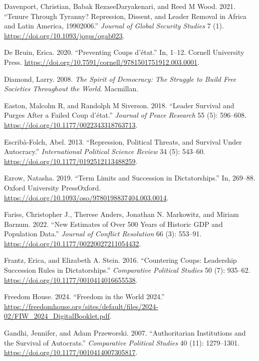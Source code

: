 \documentclass[
  12pt,
]{report}
\newlength{\cslhangindent}
\newenvironment{CSLReferences}[2] %
 {\begin{list}{}{%
  \setlength{\itemindent}{0pt}
  \setlength{\leftmargin}{0pt}
  \setlength{\parsep}{0pt}
  \ifodd #1
   \setlength{\leftmargin}{\cslhangindent}
   \setlength{\itemindent}{-1\cslhangindent}
  \fi
  \setlength{\itemsep}{#2\baselineskip}}}
 {\end{list}}
\begin{document}
\begin{CSLReferences}{1}{0}
Davenport, Christian, Babak RezaeeDaryakenari, and Reed M Wood. 2021.
{``Tenure Through Tyranny? Repression, Dissent, and Leader Removal in
Africa and Latin America, 1990{\textendash}2006.''} \emph{Journal of
Global Security Studies} 7 (1).
\url{https://doi.org/10.1093/jogss/ogab023}.

De Bruin, Erica. 2020. {``Preventing Coups d{'}état.''} In, 1--12.
Cornell University Press.
\url{https://doi.org/10.7591/cornell/9781501751912.003.0001}.

Diamond, Larry. 2008. \emph{The Spirit of Democracy: The Struggle to
Build Free Societies Throughout the World}. Macmillan.

Easton, Malcolm R, and Randolph M Siverson. 2018. {``Leader Survival and
Purges After a Failed Coup d{'}état.''} \emph{Journal of Peace Research}
55 (5): 596--608. \url{https://doi.org/10.1177/0022343318763713}.

Escribà-Folch, Abel. 2013. {``Repression, Political Threats, and
Survival Under Autocracy.''} \emph{International Political Science
Review} 34 (5): 543--60. \url{https://doi.org/10.1177/0192512113488259}.

Ezrow, Natasha. 2019. {``Term Limits and Succession in Dictatorships.''}
In, 269--88. Oxford University PressOxford.
\url{https://doi.org/10.1093/oso/9780198837404.003.0014}.

Fariss, Christopher J., Therese Anders, Jonathan N. Markowitz, and
Miriam Barnum. 2022. {``New Estimates of Over 500 Years of Historic GDP
and Population Data.''} \emph{Journal of Conflict Resolution} 66 (3):
553--91. \url{https://doi.org/10.1177/00220027211054432}.

Frantz, Erica, and Elizabeth A. Stein. 2016. {``Countering Coups:
Leadership Succession Rules in Dictatorships.''} \emph{Comparative
Political Studies} 50 (7): 935--62.
\url{https://doi.org/10.1177/0010414016655538}.

Freedom House. 2024. {``Freedom in the World 2024.''}
\url{https://freedomhouse.org/sites/default/files/2024-02/FIW_2024_DigitalBooklet.pdf}.

Gandhi, Jennifer, and Adam Przeworski. 2007. {``Authoritarian
Institutions and the Survival of Autocrats.''} \emph{Comparative
Political Studies} 40 (11): 1279--1301.
\url{https://doi.org/10.1177/0010414007305817}.


\end{CSLReferences}
\end{document}
